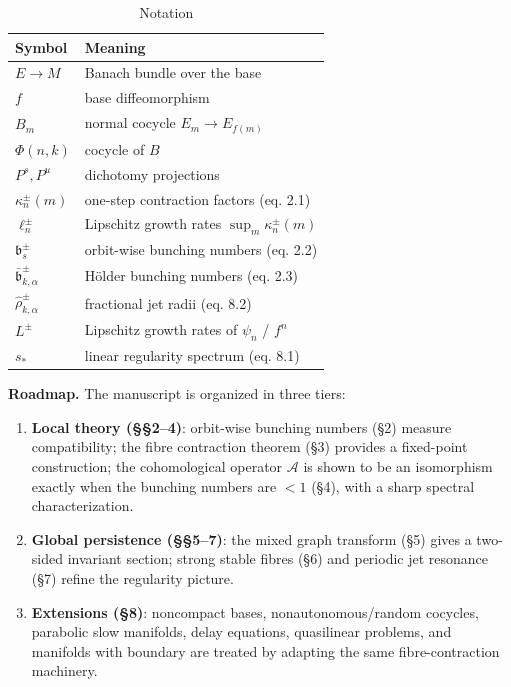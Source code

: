 \documentclass[11pt,a4paper]{article}
\theoremstyle{plain}
\theoremstyle{definition}
\theoremstyle{remark}
\numberwithin{equation}{section}
\numberwithin{figure}{section}
\begin{document}
\begin{table}[h]
\centering
\begin{tabular}{l|l}
\toprule
Symbol & Meaning \\
\midrule
$E\to M$ & Banach bundle over the base \\
$f$ & base diffeomorphism \\
$B_m$ & normal cocycle $E_m\to E_{f(m)}$ \\
$\Phi(n,k)$ & cocycle of $B$ \\
$P^{s},P^{u}$ & dichotomy projections \\
$\kappa^\pm_n(m)$ & one-step contraction factors (eq. 2.1) \\
$\ell^\pm_n$ & Lipschitz growth rates $\sup_m\kappa^\pm_n(m)$ \\
$\mathfrak b^\pm_s$ & orbit-wise bunching numbers (eq. 2.2) \\
$\bar{\mathfrak b}^\pm_{k,\alpha}$ & Hölder bunching numbers (eq. 2.3) \\
$\widehat\rho^\pm_{k,\alpha}$ & fractional jet radii (eq. 8.2) \\
$L^\pm$ & Lipschitz growth rates of $\psi_n$ / $f^n$ \\
$s_*$ & linear regularity spectrum (eq. 8.1) \\
\bottomrule
\end{tabular}
\caption{Notation}
\label{tab:notation}
\end{table}

\textbf{Roadmap.} The manuscript is organized in three tiers:

\begin{enumerate}
    \item \textbf{Local theory (§§2–4)}: orbit-wise bunching numbers (§2) measure compatibility; the fibre contraction theorem (§3) provides a fixed-point construction; the cohomological operator $\mathcal A$ is shown to be an isomorphism exactly when the bunching numbers are $<1$ (§4), with a sharp spectral characterization.
    \item \textbf{Global persistence (§§5–7)}: the mixed graph transform (§5) gives a two-sided invariant section; strong stable fibres (§6) and periodic jet resonance (§7) refine the regularity picture.
    \item \textbf{Extensions (§8)}: noncompact bases, nonautonomous/random cocycles, parabolic slow manifolds, delay equations, quasilinear problems, and manifolds with boundary are treated by adapting the same fibre-contraction machinery.
\end{enumerate}
\end{document}
